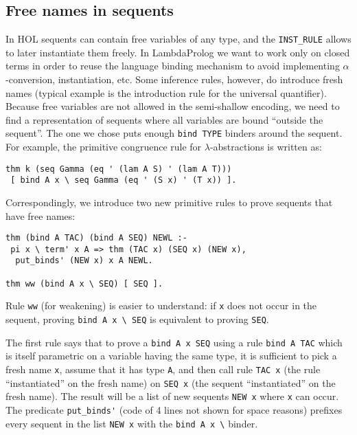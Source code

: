 \documentclass[preprint]{sigplanconf}
\begin{document}
\subsection{Free names in sequents}
In HOL sequents can contain free variables of any type, and the \verb+INST_RULE+ allows to later instantiate them freely. In LambdaProlog we want to work only on closed terms in order to reuse the language binding mechanism to avoid implementing $\alpha$-conversion, instantiation, etc. Some inference rules, however, do introduce fresh names (typical example is the introduction rule for the universal quantifier). Because free variables are not allowed in the semi-shallow encoding, we need to find a representation of sequents where all variables are bound ``outside the sequent''. The one we chose puts enough \verb+bind TYPE+ binders around the sequent. For example, the primitive congruence rule for $\lambda$-abstractions is written as:

\begin{small}
\begin{verbatim}
thm k (seq Gamma (eq ' (lam A S) ' (lam A T)))
 [ bind A x \ seq Gamma (eq ' (S x) ' (T x)) ].
\end{verbatim}
\end{small}

Correspondingly, we introduce two new primitive rules to prove sequents
that have free names:

\begin{small}
\begin{verbatim}
thm (bind A TAC) (bind A SEQ) NEWL :-
 pi x \ term' x A => thm (TAC x) (SEQ x) (NEW x),
  put_binds' (NEW x) x A NEWL.

thm ww (bind A x \ SEQ) [ SEQ ].
\end{verbatim}
\end{small}

Rule \verb+ww+ (for weakening) is easier to understand: if \verb+x+ does not occur in the sequent, proving \verb+bind A x \ SEQ+ is equivalent to proving \verb+SEQ+.

The first rule says that to prove a \verb+bind A x SEQ+ using a rule \verb+bind A TAC+ which is itself parametric on a variable having the same type, it is sufficient to pick a fresh name \verb+x+, assume that it has type \verb+A+, and then call rule \verb+TAC x+ (the rule ``instantiated'' on the fresh name) on \verb+SEQ x+ (the sequent ``instantiated'' on the fresh name). The result will be a list of new sequents \verb+NEW x+ where \verb+x+ can occur. The predicate \verb+put_binds'+ (code of 4 lines not shown for space reasons) prefixes every sequent in the list \verb+NEW x+ with the \verb+bind A x \+ binder.
\end{document}
